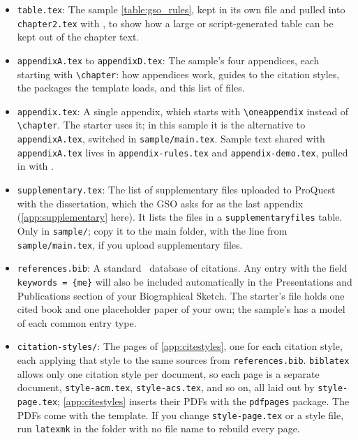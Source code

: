 \begin{itemize}
  \item \texttt{table.tex}: The sample \cref{table:gso_rules}, kept in its own file and pulled into \texttt{chapter2.tex} with \verb++, to show how a large or script-generated table can be kept out of the chapter text.

  \item \texttt{appendixA.tex} to \texttt{appendixD.tex}: The sample's four appendices, each starting with \verb+\chapter+: how appendices work, guides to the citation styles, the packages the template loads, and this list of files.

  \item \texttt{appendix.tex}: A single appendix, which starts with \verb+\oneappendix+ instead of \verb+\chapter+. The starter uses it; in this sample it is the alternative to \texttt{appendixA.tex}, switched in \texttt{sample/main.tex}. Sample text shared with \texttt{appendixA.tex} lives in \texttt{appendix-rules.tex} and \texttt{appendix-demo.tex}, pulled in with \verb++.

  \item \texttt{supplementary.tex}: The list of supplementary files uploaded to ProQuest with the dissertation, which the GSO asks for as the last appendix (\cref{app:supplementary} here). It lists the files in a \texttt{supplementaryfiles} table. Only in \texttt{sample/}; copy it to the main folder, with the \verb++ line from \texttt{sample/main.tex}, if you upload supplementary files.

  \item \texttt{references.bib}: A standard \BibTeX\ database of citations. Any entry with the field \verb+keywords = {me}+ will also be included automatically in the Presentations and Publications section of your Biographical Sketch. The starter's file holds one cited book and one placeholder paper of your own; the sample's has a model of each common entry type.

  \item \texttt{citation-styles/}: The pages of \cref{app:citestyles}, one for each citation style, each applying that style to the same sources from \texttt{references.bib}. \texttt{biblatex} allows only one citation style per document, so each page is a separate document, \texttt{style-acm.tex}, \texttt{style-acs.tex}, and so on, all laid out by \texttt{style-page.tex}; \cref{app:citestyles} inserts their PDFs with the \texttt{pdfpages} package. The PDFs come with the template. If you change \texttt{style-page.tex} or a style file, run \texttt{latexmk} in the folder with no file name to rebuild every page.


\end{itemize}
